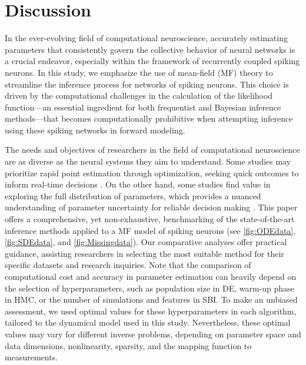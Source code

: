 \documentclass[12pt]{article}
\begin{document}

\section{Discussion}

In the ever-evolving field of computational neuroscience, accurately estimating parameters that consistently govern the collective behavior of neural networks is a crucial endeavor, especially within the framework of recurrently coupled spiking neurons. In this study, we emphasize the use of mean-field (MF) theory to streamline the inference process for networks of spiking neurons. This choice is driven by the computational challenges in the calculation of the likelihood function---an essential ingredient for both frequentist and Bayesian inference methods---that becomes computationally prohibitive when attempting inference using these spiking networks in forward modeling.


The needs and objectives of researchers in the field of computational neuroscience are as diverse as the neural systems they aim to understand. Some studies may prioritize rapid point estimation through optimization, seeking quick outcomes to inform real-time decisions \citep{Vattikonda2021, Penas2023}. On the other hand, some studies find value in exploring the full distribution of parameters, which provides a nuanced understanding of parameter uncertainty for reliable decision making \citep{Hashemi2020, Jha2022}. This paper offers a comprehensive, yet non-exhaustive, benchmarking of the state-of-the-art inference methods applied to a MF model of spiking neurons (see \autoref{fig:ODEdata}, \autoref{fig:SDEdata}, and \autoref{fig:Missingdata}). Our comparative analyses offer practical guidance, assisting researchers in selecting the most suitable method for their specific datasets and research inquiries. Note that the comparison of computational cost and accuracy in parameter estimation can heavily depend on the selection of hyperparameters, such as population size in DE, warm-up phase in HMC, or the number of simulations and features in SBI. To make an unbiased assessment, we used optimal values for these hyperparameters in each algorithm, tailored to the dynamical model used in this study. Nevertheless, these optimal values may vary for different inverse problems, depending on parameter space and data dimensions, nonlinearity, sparsity, and the mapping function to measurements.
\end{document}
